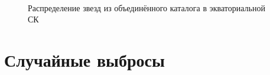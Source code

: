\documentclass[12pt,aspectratio=43]{beamer}
\begin{document}
\begin{frame}%
\begin{figure}[h!]
\\{Распределение звезд из объединённого каталога в экваториальной СК}
\end{figure}
\end{frame}	


\begin{frame}[<alignment>]
\begin{figure}[H]
\begin{minipage}[h]{0.47\linewidth}
\end{minipage}
\hfill
\begin{minipage}[h]{0.47\linewidth}
\end{minipage}
\end{figure}
\end{frame}


\section{Случайные выбросы}\label{sub:smthrs}
\end{document}

